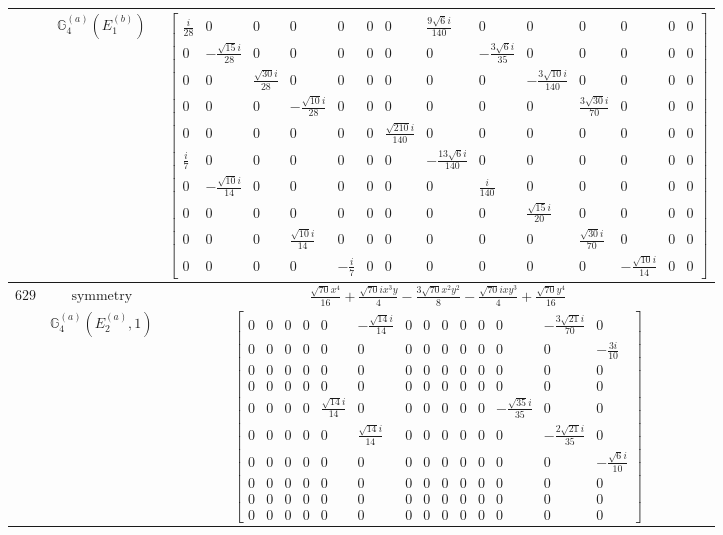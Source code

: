 \documentclass[fleqn,8pt,landscape]{jsarticle}
\begin{document}
\begin{longtable}{ccc}
$  $ & $ \mathbb{G}_{4}^{(a)}(E_{1}^{(b)}) $ & $ \begin{bmatrix} \frac{i}{28} & 0 & 0 & 0 & 0 & 0 & 0 & \frac{9 \sqrt{6} i}{140} & 0 & 0 & 0 & 0 & 0 & 0 \\ 0 & - \frac{\sqrt{15} i}{28} & 0 & 0 & 0 & 0 & 0 & 0 & - \frac{3 \sqrt{6} i}{35} & 0 & 0 & 0 & 0 & 0 \\ 0 & 0 & \frac{\sqrt{30} i}{28} & 0 & 0 & 0 & 0 & 0 & 0 & - \frac{3 \sqrt{10} i}{140} & 0 & 0 & 0 & 0 \\ 0 & 0 & 0 & - \frac{\sqrt{10} i}{28} & 0 & 0 & 0 & 0 & 0 & 0 & \frac{3 \sqrt{30} i}{70} & 0 & 0 & 0 \\ 0 & 0 & 0 & 0 & 0 & 0 & \frac{\sqrt{210} i}{140} & 0 & 0 & 0 & 0 & 0 & 0 & 0 \\ \frac{i}{7} & 0 & 0 & 0 & 0 & 0 & 0 & - \frac{13 \sqrt{6} i}{140} & 0 & 0 & 0 & 0 & 0 & 0 \\ 0 & - \frac{\sqrt{10} i}{14} & 0 & 0 & 0 & 0 & 0 & 0 & \frac{i}{140} & 0 & 0 & 0 & 0 & 0 \\ 0 & 0 & 0 & 0 & 0 & 0 & 0 & 0 & 0 & \frac{\sqrt{15} i}{20} & 0 & 0 & 0 & 0 \\ 0 & 0 & 0 & \frac{\sqrt{10} i}{14} & 0 & 0 & 0 & 0 & 0 & 0 & \frac{\sqrt{30} i}{70} & 0 & 0 & 0 \\ 0 & 0 & 0 & 0 & - \frac{i}{7} & 0 & 0 & 0 & 0 & 0 & 0 & - \frac{\sqrt{10} i}{14} & 0 & 0 \end{bmatrix} $ \\ \hline
$ 629 $ & $ \text{symmetry} $ & $ \frac{\sqrt{70} x^{4}}{16} + \frac{\sqrt{70} i x^{3} y}{4} - \frac{3 \sqrt{70} x^{2} y^{2}}{8} - \frac{\sqrt{70} i x y^{3}}{4} + \frac{\sqrt{70} y^{4}}{16} $ \\
$  $ & $ \mathbb{G}_{4}^{(a)}(E_{2}^{(a)},1) $ & $ \begin{bmatrix} 0 & 0 & 0 & 0 & 0 & - \frac{\sqrt{14} i}{14} & 0 & 0 & 0 & 0 & 0 & 0 & - \frac{3 \sqrt{21} i}{70} & 0 \\ 0 & 0 & 0 & 0 & 0 & 0 & 0 & 0 & 0 & 0 & 0 & 0 & 0 & - \frac{3 i}{10} \\ 0 & 0 & 0 & 0 & 0 & 0 & 0 & 0 & 0 & 0 & 0 & 0 & 0 & 0 \\ 0 & 0 & 0 & 0 & 0 & 0 & 0 & 0 & 0 & 0 & 0 & 0 & 0 & 0 \\ 0 & 0 & 0 & 0 & \frac{\sqrt{14} i}{14} & 0 & 0 & 0 & 0 & 0 & 0 & - \frac{\sqrt{35} i}{35} & 0 & 0 \\ 0 & 0 & 0 & 0 & 0 & \frac{\sqrt{14} i}{14} & 0 & 0 & 0 & 0 & 0 & 0 & - \frac{2 \sqrt{21} i}{35} & 0 \\ 0 & 0 & 0 & 0 & 0 & 0 & 0 & 0 & 0 & 0 & 0 & 0 & 0 & - \frac{\sqrt{6} i}{10} \\ 0 & 0 & 0 & 0 & 0 & 0 & 0 & 0 & 0 & 0 & 0 & 0 & 0 & 0 \\ 0 & 0 & 0 & 0 & 0 & 0 & 0 & 0 & 0 & 0 & 0 & 0 & 0 & 0 \\ 0 & 0 & 0 & 0 & 0 & 0 & 0 & 0 & 0 & 0 & 0 & 0 & 0 & 0 \end{bmatrix} $ \\ \hline

\end{longtable}
\end{document}
